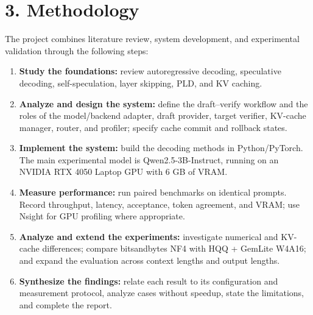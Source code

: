 \section*{3. Methodology}
The project combines literature review, system development, and experimental validation through the following steps:
\begin{enumerate}
    \item \textbf{Study the foundations:} review autoregressive decoding, speculative decoding, self-speculation, layer skipping, PLD, and KV caching.
    \item \textbf{Analyze and design the system:} define the draft--verify workflow and the roles of the model/backend adapter, draft provider, target verifier, KV-cache manager, router, and profiler; specify cache commit and rollback states.
    \item \textbf{Implement the system:} build the decoding methods in Python/PyTorch. The main experimental model is Qwen2.5-3B-Instruct, running on an NVIDIA RTX 4050 Laptop GPU with 6 GB of VRAM.
    \item \textbf{Measure performance:} run paired benchmarks on identical prompts. Record throughput, latency, acceptance, token agreement, and VRAM; use Nsight for GPU profiling where appropriate.
    \item \textbf{Analyze and extend the experiments:} investigate numerical and KV-cache differences; compare bitsandbytes NF4 with HQQ + GemLite W4A16; and expand the evaluation across context lengths and output lengths.
    \item \textbf{Synthesize the findings:} relate each result to its configuration and measurement protocol, analyze cases without speedup, state the limitations, and complete the report.
\end{enumerate}


